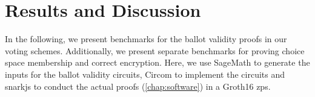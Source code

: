 \chapter{Results and Discussion}
\label{chap:results}

In the following, we present benchmarks for the ballot validity proofs in our voting schemes.
Additionally, we present separate benchmarks for proving choice space membership and correct encryption.
Here, we use SageMath to generate the inputs for the ballot validity circuits, Circom to implement the circuits and snarkjs to conduct the actual proofs (\cref{chap:software}) in a Groth16 \gls{zps}.


